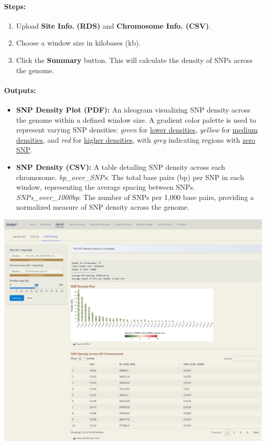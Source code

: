 \documentclass[
]{book}
\begin{document}
\paragraph*{Steps:}\label{steps}

\begin{enumerate}
\def\labelenumi{\arabic{enumi}.}
\item
  {Upload} \textbf{Site Info.} \textbf{(RDS)} and \textbf{Chromosome Info. (CSV)}.
\item
  Choose a window size in kilobases (kb).
\item
  Click the {\textbf{Summary}} button. This will calculate the density of SNPs across the genome.
\end{enumerate}

\paragraph*{Outputs:}\label{outputs-3}

\begin{itemize}
\item
  \textbf{SNP Density Plot (PDF):} An ideogram visualizing SNP density across the genome within a defined window size. A gradient color palette is used to represent varying SNP densities: \emph{green} for \ul{lower densities}, \emph{yellow} for \ul{medium densities}, and \emph{red} for \ul{higher densities}, with \emph{grey} indicating regions with \ul{zero SNP}.
\item
  \textbf{SNP Density (CSV):} A table detailing SNP density across each chromosome. \emph{bp\_over\_SNPs}: The total base pairs (bp) per SNP in each window, representing the average spacing between SNPs. \emph{SNPs\_over\_1000bp}: The number of SNPs per 1,000 base pairs, providing a normalized measure of SNP density across the genome.
\end{itemize}

\includegraphics[width=8.33333in,height=\textheight]{images/clipboard-3331950775.png}
\end{document}
